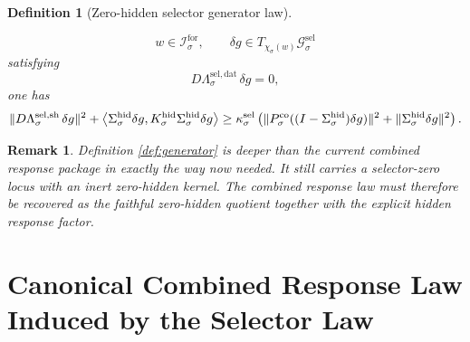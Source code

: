 \documentclass[11pt]{article}
\newcommand{\ForSpace}[1]{\mathcal I_{#1}^{\mathrm{for}}}
\newcommand{\HiddenOperator}[1]{K_{#1}^{\mathrm{hid}}}
\newcommand{\GenSpace}[1]{\mathcal G_{#1}^{\mathrm{sel}}}
\newcommand{\GenData}[1]{\Lambda_{#1}^{\mathrm{sel,dat}}}
\newcommand{\GenShell}[1]{\Lambda_{#1}^{\mathrm{sel,sh}}}
\newcommand{\HiddenSel}[1]{\Sigma_{#1}^{\mathrm{hid}}}
\newcommand{\GenEmbed}[1]{\chi_{#1}}
\newcommand{\StateComp}[1]{P_{#1}^{\mathrm{co}}}
\newtheorem{definition}{Definition}
\newtheorem{remark}{Remark}
\begin{document}
\begin{definition}[Zero-hidden selector generator law]
\begin{enumerate}
    \[
    w\in\ForSpace{\sigma},
    \qquad
    \delta g\in T_{\GenEmbed{\sigma}(w)}\GenSpace{\sigma}
    \]
    satisfying
    \[
    D\GenData{\sigma}\,\delta g=0,
    \]
    one has
    \begin{equation}
    \|D\GenShell{\sigma}\,\delta g\|^{2}
    +
    \ev{
    \HiddenSel{\sigma}\delta g,
    \HiddenOperator{\sigma}\HiddenSel{\sigma}\delta g
    }
    \ge
    \kappa_{\sigma}^{\mathrm{sel}}
    \left(
    \|\StateComp{\sigma}( (I-\HiddenSel{\sigma})\delta g )\|^{2}
    +
    \|\HiddenSel{\sigma}\delta g\|^{2}
    \right).
    \label{eq:gencoercive}
    \end{equation}
\end{enumerate}
\end{definition}

\begin{remark}
Definition \ref{def:generator} is deeper than the current combined response package in exactly the way now needed. It still carries a selector-zero locus with an inert zero-hidden kernel. The combined response law must therefore be recovered as the faithful zero-hidden quotient together with the explicit hidden response factor.
\end{remark}

\section{Canonical Combined Response Law Induced by the Selector Law}
\end{document}
